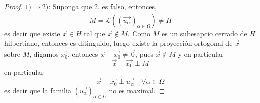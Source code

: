\documentclass[12pt]{report}
\theoremstyle{largebreak}
\begin{document}
    \begin{proof}
        $1)\Rightarrow 2)$: Suponga que 2. es falso, entonces,
        \begin{equation*}
            M=\overline{\mathcal{L}\left(\left(\vec{u_\alpha} \right)_{\alpha\in\Omega}\right)}\neq H
        \end{equation*}
        es decir que existe $\vec{x}\in H$ tal que $\vec{x}\notin M$. Como $M$ es un subesapcio cerrado de $H$ hilbertiano, entonces es ditinguido, luego existe la proyección ortogonal de $\vec{x}$ sobre $M$, digamos $\vec{x_0}$, entonces $\vec{x}-\vec{x_0}\neq\vec{0}$, pues $\vec{x}\notin M$ y en particular
        \begin{equation*}
            \vec{x}-\vec{x_0}\perp M
        \end{equation*}
        en particular
        \begin{equation*}
            \vec{x}-\vec{x_0}\perp\vec{u_\alpha}\quad\forall\alpha\in\Omega
        \end{equation*}
        es decir que la familia $\left(\vec{u_\alpha} \right)_{\alpha\in\Omega}$ no es maximal.


\end{proof}
\end{document}
